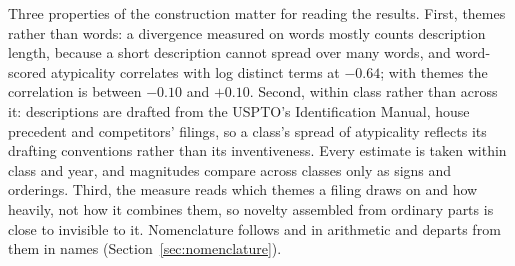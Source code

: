 Three properties of the construction matter for reading the results.
First, themes rather than words: a divergence measured on words mostly
counts description length, because a short description cannot spread
over many words, and word-scored atypicality correlates with log
distinct terms at $-0.64$; with themes the correlation is between $-0.10$
and $+0.10$. Second, within class rather than across it: descriptions
are drafted from the USPTO's Identification Manual, house precedent and
competitors' filings, so a class's spread of atypicality reflects its
drafting conventions rather than its inventiveness. Every estimate is
taken within class and year, and magnitudes compare across classes only
as signs and orderings. Third, the measure reads which themes a filing
draws on and how heavily, not how it combines them, so novelty assembled
from ordinary parts is close to invisible to it. Nomenclature follows
\citet{Murdock2017} and \citet{Barron2018} in arithmetic and departs from
them in names (Section~\ref{sec:nomenclature}).
